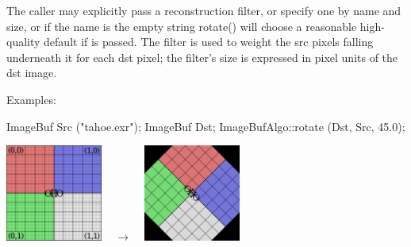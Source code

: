 The caller may explicitly pass a reconstruction filter, or specify one by
name and size, or if the name is the empty string {\cf rotate()} will choose
a reasonable high-quality default if \NULL is passed.  The filter is used to
weight the {\cf src} pixels falling underneath it for each {\cf dst} pixel;
the filter's size is expressed in pixel units of the {\cf dst} image.

\smallskip
\noindent Examples:
\begin{code}
    ImageBuf Src ("tahoe.exr");
    ImageBuf Dst;
    ImageBufAlgo::rotate (Dst, Src, 45.0);
\end{code}
\spc \includegraphics[width=1.25in]{figures/grid-small.jpg} 
~ {\Huge $\rightarrow$} ~
\includegraphics[width=1.25in]{figures/rotate45.jpg} \\
\apiend


 

